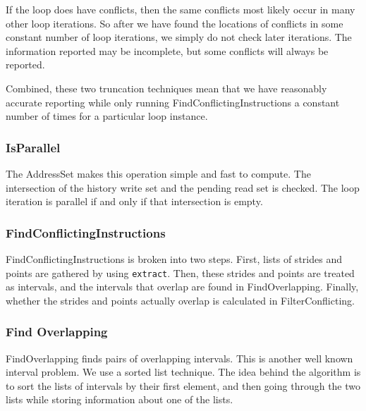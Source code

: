 \documentclass[12pt,twoside]{reedthesis}
\begin{document}
			If the loop does have conflicts, then the same conflicts most likely occur in many other loop iterations. So after we have found the locations of conflicts in some constant number of loop iterations, we simply do not check later iterations. The information reported may be incomplete, but some conflicts will always be reported.%
			
			Combined, these two truncation techniques mean that we have reasonably accurate reporting while only running FindConflictingInstructions a constant number of times for a particular loop instance.
		
		\subsubsection{IsParallel}
		
			The AddressSet makes this operation simple and fast to compute. The intersection of the history write set and the pending read set is checked. The loop iteration is parallel if and only if that intersection is empty. 
			
		\subsubsection{FindConflictingInstructions}
		
			FindConflictingInstructions is broken into two steps. First, lists of strides and points are gathered by using \texttt{extract}. Then, these strides and points are treated as intervals, and the intervals that overlap are found in FindOverlapping. Finally, whether the strides and points actually overlap is calculated in FilterConflicting.
			
		\subsubsection{Find Overlapping}
		
			FindOverlapping finds pairs of overlapping intervals. This is another well known interval problem. We use a sorted list technique. 
			The idea behind the algorithm is to sort the lists of intervals by their first element, and then going through the two lists while storing information about one of the lists. 
			
\end{document}

